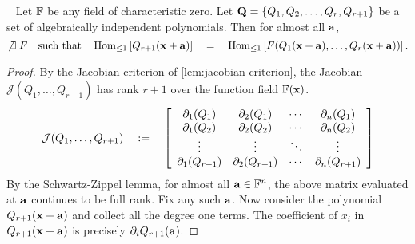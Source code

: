 \begin{lemma}~\label{lem:using algebraic dependence-converse} Let $\mathbb{F}$ be any field of characteristic zero.
Let $\mathbf{Q} = \left\{Q_1, Q_2, \ldots, Q_r,Q_{r+1}\right\}$ be a set of algebraically independent polynomials.
Then for almost all $\mathbf{a}$,
\[
\not\exists \; F \quad \text{such that} \quad \operatorname{Hom}_{\leq 1}\left[Q_{r+1}(\mathbf{x} + \mathbf{a})\right] \quad = \quad \operatorname{Hom}_{\leq 1}\left[F(Q_1(\mathbf{x} + \mathbf{a}), \ldots, Q_r(\mathbf{x} + \mathbf{a}))\right].
\]
\end{lemma}
\begin{proof}
By the Jacobian criterion of \autoref{lem:jacobian-criterion}, the Jacobian $\mathcal{J}(Q_1,\ldots, Q_{r+1})$ has rank $r+1$ over the function field $\mathbb{F}(\mathbf{x})$. 
\[
\mathcal{J}(Q_1,\ldots, Q_{r+1}) \quad := \quad \left[\begin{array}{cccc}
\partial_1(Q_1) & \partial_2(Q_1) & \cdots & \partial_n(Q_1)\\
\partial_1(Q_2) & \partial_2(Q_2) & \cdots & \partial_n(Q_2)\\
\vdots & \vdots & \ddots & \vdots\\
\partial_1(Q_{r+1}) & \partial_2(Q_{r+1}) & \cdots & \partial_n(Q_{r+1})
                                          \end{array}\right]                                          
\]
By the Schwartz-Zippel lemma, for almost all $\mathbf{a} \in \mathbb{F}^n$, the above matrix evaluated at $\mathbf{a}$ continues to be full rank. Fix any such $\mathbf{a}$. Now consider the polynomial $Q_{r+1}(\mathbf{x} + \mathbf{a})$ and collect all the degree one terms. The coefficient of $x_i$ in $Q_{r+1}(\mathbf{x} + \mathbf{a})$ is precisely $\partial_i Q_{r+1}(\mathbf{a})$. 


\end{proof}
